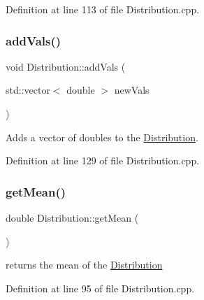 Definition at line 113 of file Distribution.\+cpp.

\mbox{\label{class_world_architect_1_1_distribution_a42bcb9543c69fb3b07f84038a9344dae}} 
\subsubsection{\texorpdfstring{addVals()}{addVals()}}
{\footnotesize\ttfamily void Distribution\+::add\+Vals (\begin{DoxyParamCaption}\item[{std\+::vector$<$ double $>$}]{new\+Vals }\end{DoxyParamCaption})}



Adds a vector of doubles to the \mbox{\hyperlink{class_world_architect_1_1_distribution}{Distribution}}. 



Definition at line 129 of file Distribution.\+cpp.

\mbox{\label{class_world_architect_1_1_distribution_ab73d4ad1b0fb08c1fc9fe4c4973ff853}} 
\subsubsection{\texorpdfstring{getMean()}{getMean()}}
{\footnotesize\ttfamily double Distribution\+::get\+Mean (\begin{DoxyParamCaption}{ }\end{DoxyParamCaption})}



returns the mean of the \mbox{\hyperlink{class_world_architect_1_1_distribution}{Distribution}} 



Definition at line 95 of file Distribution.\+cpp.

\mbox{\label{class_world_architect_1_1_distribution_a2a692fa51284c64fd37476e7d6b1376e}} 
